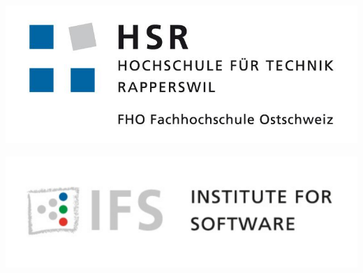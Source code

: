 


\begin{titlepage}

\begin{center}
\begin{minipage}[t]{0.45\textwidth}
    \includegraphics[width=\textwidth]{start/img/hsrLogo}
\end{minipage}
\hspace{\fill} %
\begin{minipage}[t]{0.45\textwidth}
    \vspace{-3.26cm}
    \includegraphics[width=\textwidth]{start/img/ifsLogo} %
\end{minipage}

\end{center}

\vspace{15ex} %
\begin{center}
	\Huge 
	\begin{framed}
		\textbf{\titel}
	\end{framed}
	
	\vspace{3ex}
	\textbf{\work}
	
	\vspace{1ex}
	\LARGE 
	\place
	

\end{center}
\end{titlepage}
